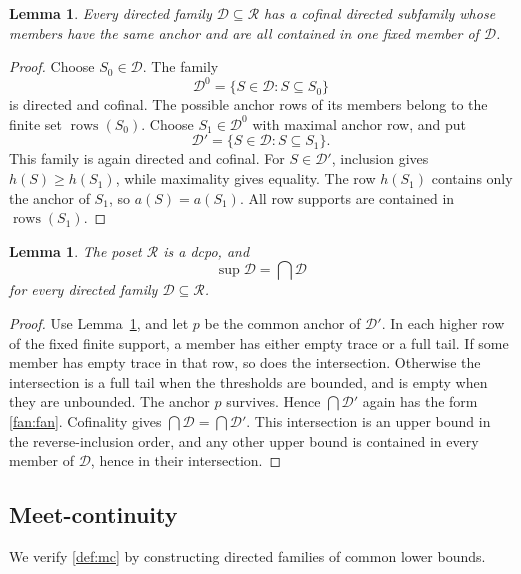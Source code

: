 \documentclass[10pt,a4paper]{article}
\newtheorem{lemma}[theorem]{Lemma}
\theoremstyle{definition}
\newcommand{\RR}{\mathcal R}
\newcommand{\rows}{\operatorname{rows}}
\begin{document}
\begin{lemma}\label{fan:anchor}
Every directed family $\mathcal D\subseteq\RR$ has a cofinal directed subfamily whose members have the same anchor and are all contained in one fixed member of $\mathcal D$.
\end{lemma}
\begin{proof}
Choose $S_0\in\mathcal D$. The family
\[
 \mathcal D^0=\{S\in\mathcal D:S\subseteq S_0\}
\]
is directed and cofinal. The possible anchor rows of its members belong to the finite set $\rows(S_0)$. Choose $S_1\in\mathcal D^0$ with maximal anchor row, and put
\[
 \mathcal D'=\{S\in\mathcal D:S\subseteq S_1\}.
\]
This family is again directed and cofinal. For $S\in\mathcal D'$, inclusion gives $h(S)\geq h(S_1)$, while maximality gives equality. The row $h(S_1)$ contains only the anchor of $S_1$, so $a(S)=a(S_1)$. All row supports are contained in $\rows(S_1)$.
\end{proof}

\begin{lemma}\label{fan:dcpo}
The poset $\RR$ is a dcpo, and
\[
 \sup\mathcal D=\bigcap\mathcal D
\]
for every directed family $\mathcal D\subseteq\RR$.
\end{lemma}
\begin{proof}
Use Lemma~\ref{fan:anchor}, and let $p$ be the common anchor of $\mathcal D'$. In each higher row of the fixed finite support, a member has either empty trace or a full tail. If some member has empty trace in that row, so does the intersection. Otherwise the intersection is a full tail when the thresholds are bounded, and is empty when they are unbounded. The anchor $p$ survives. Hence $\bigcap\mathcal D'$ again has the form \eqref{fan:fan}. Cofinality gives $\bigcap\mathcal D=\bigcap\mathcal D'$. This intersection is an upper bound in the reverse-inclusion order, and any other upper bound is contained in every member of $\mathcal D$, hence in their intersection.
\end{proof}

\subsection{Meet-continuity}
We verify \eqref{def:mc} by constructing directed families of common lower bounds.
\end{document}

